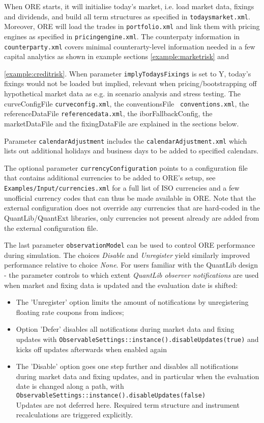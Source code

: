 When ORE starts, it will initialise today's market, i.e. load market data, fixings and dividends, and build all term
structures as specified in {\tt todaysmarket.xml}.  Moreover, ORE will load the trades in {\tt portfolio.xml} and link
them with pricing engines as specified in {\tt pricingengine.xml}. The counterpaty information in {\tt counterparty.xml} covers
minimal counterarty-level information needed in a few capital analytics as shown in example sections \ref{example:marketrisk} and {\ref{example:creditrisk}.
When parameter {\tt implyTodaysFixings} is set to Y,
today's fixings would not be loaded but implied, relevant when pricing/bootstrapping off hypothetical market data as
e.g. in scenario analysis and stress testing. The curveConfigFile {\tt curveconfig.xml}, the conventionsFile {\tt
  conventions.xml}, the referenceDataFile {\tt referencedata.xml}, the iborFallbackConfig, the marketDataFile and the
fixingDataFile are explained in the sections below.

\medskip Parameter {\tt calendarAdjustment} includes the {\tt calendarAdjustment.xml} which lists out additional holidays and
business days to be added to specified calendars.

\medskip The optional parameter {\tt currencyConfiguration} points to a configuration file that contains additional currencies
to be added to ORE's setup, see {\tt Examples/Input/currencies.xml} for a full list of ISO currencies and a few unofficial currency
codes that can thus be made available in ORE. Note that the external configuration does not override any currencies that are
hard-coded in the QuantLib/QuantExt libraries, only currencies not present already are added from the external configuration file.

\medskip The last parameter {\tt observationModel} can be used to control ORE performance during simulation. The choices
{\em Disable } and {\em Unregister } yield similarly improved performance relative to choice {\em None}. For users
familiar with the QuantLib design - the parameter controls to which extent {\em QuantLib observer notifications} are
used when market and fixing data is updated and the evaluation date is shifted:
\begin{itemize}
\item The 'Unregister' option limits the amount of notifications by unregistering floating rate coupons from indices;
\item Option 'Defer' disables all notifications during market data and fixing updates with
{\tt ObservableSettings::instance().disableUpdates(true)}
and kicks off updates afterwards when enabled again
\item The 'Disable' option goes one step further and disables all notifications during market data and fixing updates,
  and in particular when the evaluation date is changed along a path, with \\
  {\tt ObservableSettings::instance().disableUpdates(false)} \\
  Updates are not deferred here. Required term structure and instrument recalculations are triggered explicitly.
\end{itemize}

}
